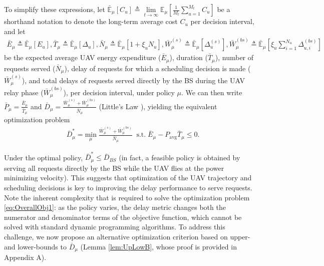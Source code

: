 \documentclass[12pt, draftcls, onecolumn]{IEEEtran}
\theoremstyle{plain}
\theoremstyle{definition}
\theoremstyle{remark}
\begin{document}
To simplify these expressions, let
$\bar{\mathbb{E}}_{\mu}[C_u]\triangleq\lim\limits_{t \rightarrow \infty} \mathbb{E}_{\mu}
[\frac{1}{M_t} \sum_{u = 1}^{M_t }C_u]$ be a shorthand notation to denote the long-term average cost $C_u$ per decision interval, and let
\begin{align}\label{eq:BarDefs}
    \bar{E}_{\mu}{\triangleq}\bar{\mathbb{E}}_{\mu} \left[E_u\right],
    \bar{T}_{\mu}{\triangleq}\bar{\mathbb{E}}_{\mu} \left[\Delta_u\right],
    \bar{N}_{\mu}{\triangleq}\bar{\mathbb{E}}_{\mu} \left[1+\xi_uN_u\right],
    \bar{W}_{\mu}^{(s)}{\triangleq}\bar{\mathbb{E}}_{\mu}\left[\Delta_u^{(s)}\right],
    \bar{W}_{\mu}^{(bs)}{\triangleq}\bar{\mathbb{E}}_{\mu}\left[\xi_u\sum_{i=1}^{N_u}\Delta_{u,i}^{(bs)}\right]
\end{align}
be the expected average UAV energy expenditure ($\bar{E}_{\mu}$), duration ($\bar{T}_{\mu}$), number of requests served ($\bar{N}_{\mu}$), delay of requests for which a scheduling decision is made ($\bar{W}_{\mu}^{(s)}$), and total delays of requests served directly by the BS during the UAV relay phase
($\bar{W}_{\mu}^{(bs)}$), per decision interval, under policy $\mu$. We can then write $\bar{P}_{\mu}{=}\frac{\bar{E}_{\mu}}{\bar{T}_{\mu}}$ and $\bar{D}_{\mu}{=}\frac{\bar{W}_{\mu}^{(s)}+\bar{W}_{\mu}^{(bs)}}{\bar{N}_{\mu}}$ (Little's Law \cite{LittlesLaw}), yielding the equivalent optimization problem
\begin{align}\label{eq:OverallObj1}
    &\bar{D}_{\mu}^{*} = \underset{\mu}{\mathrm{min}} \; 
	\frac{\bar{W}_{\mu}^{(s)}+\bar{W}_{\mu}^{(bs)}}{\bar{N}_{\mu}}\;\;
	\mathrm{s.t.} \; \bar{E}_{\mu}-P_{\mathrm{avg}}\bar{T}_{\mu}\leq 0.
\end{align}

Under the optimal policy, $\bar{D}_{\mu}^{*}{\leq}\bar{D}_{BS}$ (in fact, a feasible policy is obtained by serving all requests directly by the BS while the UAV flies at the power minimizing velocity). This suggests that optimization of the UAV trajectory and scheduling decisions is key to improving the delay performance to serve requests. Note the inherent complexity that is required to solve the optimization problem \eqref{eq:OverallObj1}: as the policy varies, the delay metric changes both the numerator and denominator terms of the objective function, which cannot be solved with standard dynamic programming algorithms. To address this challenge, we now propose an alternative optimization criterion based on upper- and lower-bounds to $\bar{D}_{\mu}$ (Lemma \ref{lem:UpLowB}, whose proof is provided in Appendix A).
\end{document}
